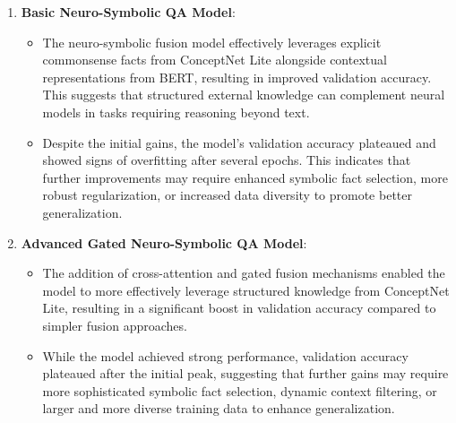 \documentclass[10.5pt]{article}
\begin{document}
\begin{enumerate}
    \item \textbf{Basic Neuro-Symbolic QA Model}:
    \begin{itemize}
        \item The neuro-symbolic fusion model effectively leverages explicit commonsense facts from ConceptNet Lite alongside contextual representations from BERT, resulting in improved validation accuracy. This suggests that structured external knowledge can complement neural models in tasks requiring reasoning beyond text.
        \item Despite the initial gains, the model’s validation accuracy plateaued and showed signs of overfitting after several epochs. This indicates that further improvements may require enhanced symbolic fact selection, more robust regularization, or increased data diversity to promote better generalization.
    \end{itemize}

    \item \textbf{Advanced Gated Neuro-Symbolic QA Model}:
    \begin{itemize}
        \item The addition of cross-attention and gated fusion mechanisms enabled the model to more effectively leverage structured knowledge from ConceptNet Lite, resulting in a significant boost in validation accuracy compared to simpler fusion approaches.
        \item While the model achieved strong performance, validation accuracy plateaued after the initial peak, suggesting that further gains may require more sophisticated symbolic fact selection, dynamic context filtering, or larger and more diverse training data to enhance generalization.
    \end{itemize}
    
\end{enumerate}
\end{document}

